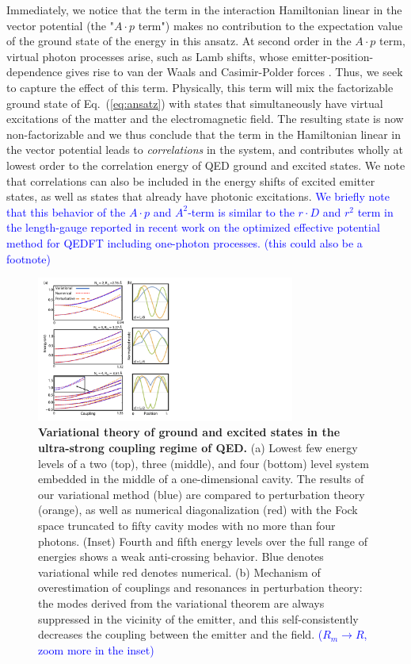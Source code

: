 \documentclass[aps,prl,twocolumn,
	groupedaddress,superscriptaddress,
	amsfonts,amssymb,amsmath,floatfix,
	citeautoscript]{revtex4-1}
\newcommand{\Jadd}[1]{\textcolor{blue}{#1}}
\begin{document}
Immediately, we notice that the term in the interaction Hamiltonian linear in the vector potential (the "$A\cdot p$ term") makes no contribution to the expectation value of the ground state of the energy in this ansatz. At second order in the $A\cdot p$ term, virtual photon processes arise, such as Lamb shifts, whose emitter-position-dependence gives rise to van der Waals and Casimir-Polder forces  \cite{scheel2009macroscopic}. Thus, we seek to capture the effect of this term. Physically, this term will mix the factorizable ground state of Eq.~(\ref{eq:ansatz}) with states that simultaneously have virtual excitations of the matter and the electromagnetic field. The resulting state is now non-factorizable and we thus conclude that the term in the Hamiltonian linear in the vector potential leads to \textit{correlations} in the system, and contributes wholly at lowest order to the correlation energy of QED ground and excited states. We note that correlations can also be included in the energy shifts of excited emitter states, as well as states that already have photonic excitations. \Jadd{We briefly note that this behavior of the $A\cdot p$ and $A^2$-term is similar to the ${r}\cdot D$ and $r^2$ term in the length-gauge reported in recent work on the optimized effective potential~\cite{pellegrini2015,flick2017c} method for QEDFT including one-photon processes. (this could also be a footnote) }
\begin{figure}[t]
\includegraphics[width=8.5cm]{Figure2and3combined.pdf}
\caption{\textbf{Variational theory of ground and excited states in the ultra-strong coupling regime of QED.} (a) Lowest few energy levels of a two (top), three (middle), and four (bottom) level system embedded in the middle of a one-dimensional cavity. The results of our variational method (blue) are compared to perturbation theory (orange), as well as numerical diagonalization (red) with the Fock space truncated to fifty cavity modes with no more than four photons. (Inset) Fourth and fifth energy levels over the full range of energies shows a weak anti-crossing behavior. Blue denotes variational while red denotes numerical. (b) Mechanism of overestimation of couplings and resonances in perturbation theory: the modes derived from the variational theorem are always suppressed in the vicinity of the emitter, and this self-consistently decreases the coupling between the emitter and the field. \Jadd{($R_m\rightarrow R$, zoom more in the inset)}  }
\label{fig:results}
\end{figure}
\end{document}
